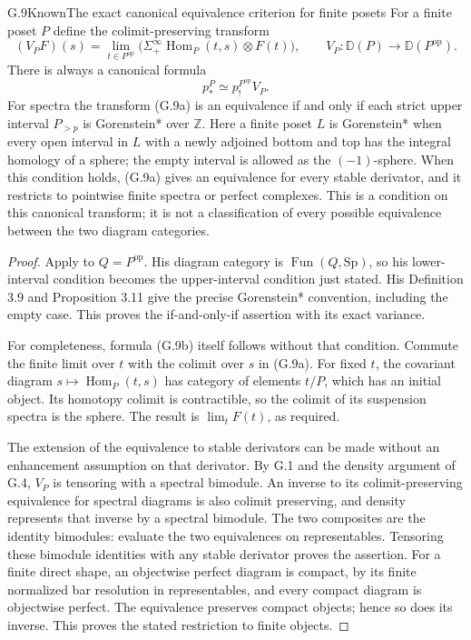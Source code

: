 \begin{claim}{G.9}{Known}{The exact canonical equivalence criterion for finite posets}
For a finite poset $P$ define the colimit-preserving transform
\[
 (V_PF)(s)=
 \lim_{t\in P^{\mathrm{op}}}
  \bigl(\Sigma^\infty_+\operatorname{Hom}_P(t,s)\otimes F(t)\bigr),
 \qquad V_P:\mathbb D(P)\longrightarrow\mathbb D(P^{\mathrm{op}}).
\tag{G.9a}
\]
There is always a canonical formula
\[
 p_*^P\simeq p_!^{P^{\mathrm{op}}}V_P.
\tag{G.9b}
\]
For spectra the transform (G.9a) is an equivalence if and only if
each strict upper interval $P_{>p}$ is Gorenstein* over $\mathbb Z$.
Here a finite poset $L$ is Gorenstein* when every open interval in
$L$ with a newly adjoined bottom and top has the integral homology
of a sphere; the empty interval is allowed as the $(-1)$-sphere.
When this condition holds, (G.9a) gives an equivalence for every
stable derivator, and it restricts to pointwise finite spectra or
perfect complexes. This is a condition on this canonical transform;
it is not a classification of every possible equivalence between
the two diagram categories.
\end{claim}
\begin{proof}
Apply \citet[Theorem A and Proposition 5.12]{DGAoki2022} to
$Q=P^{\mathrm{op}}$. His diagram category is
$\operatorname{Fun}(Q,\mathrm{Sp})$, so his lower-interval
condition becomes the upper-interval condition just stated.
His Definition 3.9 and Proposition 3.11 give the precise
Gorenstein* convention, including the empty case. This proves the
if-and-only-if assertion with its exact variance.

For completeness, formula (G.9b) itself follows without that
condition. Commute the finite limit over $t$ with the colimit over
$s$ in (G.9a). For fixed $t$, the covariant diagram
$s\mapsto\operatorname{Hom}_P(t,s)$ has category of elements
$t/P$, which has an initial object. Its homotopy colimit is
contractible, so the colimit of its suspension spectra is the
sphere. The result is $\lim_t F(t)$, as required.

The extension of the equivalence to stable derivators can be made
without an enhancement assumption on that derivator. By G.1 and
the density argument of G.4, $V_P$ is tensoring with a spectral
bimodule. An inverse to its colimit-preserving equivalence for
spectral diagrams is also colimit preserving, and density represents
that inverse by a spectral bimodule. The two composites are the
identity bimodules: evaluate the two equivalences on representables.
Tensoring these bimodule identities with any stable derivator
proves the assertion. For a finite direct shape, an objectwise
perfect diagram is compact, by its finite normalized bar resolution
in representables, and every compact diagram is objectwise perfect.
The equivalence preserves compact objects; hence so does its
inverse. This proves the stated restriction to finite objects.
\end{proof}

